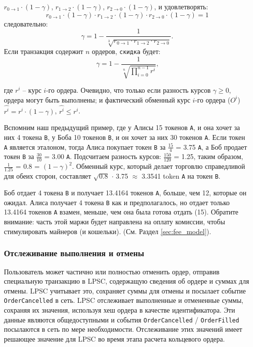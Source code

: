 \documentclass[utf8,nofonts]{article}
\begin{document}
\begin{multicols}{2}
	$r_{0\rightarrow 1} \cdot (1-\gamma)$, $r_{1\rightarrow 2} \cdot (1-\gamma)$, $r_{2 \rightarrow 0} \cdot (1-\gamma)$, и удовлетворять: 
	\begin{equation}
	r_{0\rightarrow 1} \cdot (1-\gamma)\cdot r_{1\rightarrow 2} \cdot (1-\gamma) \cdot r_{2 \rightarrow 0} \cdot (1-\gamma) = 1
	\end{equation}
	следовательно: 
	\begin{equation}
	\gamma = 1- \frac{1}{\sqrt[3]{r_{0\rightarrow 1} \cdot r_{1\rightarrow 2} \cdot r_{2\rightarrow 0}}}\text{.}
	\end{equation}
	Если транзакция содержит $n$ ордеров, \texttt{скидка} будет: 
	\begin{equation}
	\gamma = 1- \frac{1}{\sqrt[n]{\prod_{i=0}^{n-1} r^i}} \text{,}
	\end{equation}
	
	где $r^i$ -- курс $i$-го ордера. Очевидно, что только если разность курсов $ \gamma \ge 0 $, ордера могут быть выполнены; и фактический обменный курс $ i $-го ордера ($ O^i $) $\hat{r^i} = r^i \cdot (1-\gamma)$, $\hat{r^i}\le r^i$.
	
	Вспомним наш предыдущий пример, где у Алисы 15 токенов \verb|A|, и она хочет за них 4 токена \verb|B|, у Боба 10 токенов \verb|B|, и он хочет за них 30 токенов \verb|A|. Если токен \verb|A| является эталоном, тогда Алиса покупает токен \verb|B| за $ \frac{15}{4} $ = 3.75 \verb|A|, а Боб продает токен \verb|B| за $ \frac {30} {10} $ = 3.00 \verb|A|. Подсчитаем разность курсов: $ \frac {150} {120} $ = 1.25, таким образом, $ \frac {1} {1.25} $ = 0.8 = $ (1 - \gamma) ^ 2 $. Обменный курс, который делает торговлю справедливой для обеих сторон, составляет $ \sqrt {0.8} $ $ \cdot $ 3.75 $ \approx $ 3.3541 token \verb|A| на токен \verb|B|.
	
	Боб отдает 4 токена \verb|B| и получает 13.4164 токенов \verb|A|, больше, чем 12, которые он ожидал. Алиса получает 4 токена \verb|B| как и предполагалось, но отдает только 13.4164 токенов \verb|A| взамен, меньше, чем она была готова отдать (15).
	Обратите внимание: часть этой маржи будет направлена на оплату комиссии, чтобы стимулировать майнеров (и кошельки). (См. Раздел \ref{sec:fee_model}).
	
	
	\subsubsection{Отслеживание выполнения и отмены}
	
	Пользователь может частично или полностью отменить ордер, отправив специальную транзакцию в LPSC, содержащую сведения об ордере и суммах для отмены. LPSC учитывает это, сохраняет суммы для отмены и посылает событие \verb|OrderCancelled| в сеть. LPSC отслеживает выполненные и отмененные суммы, сохраняя их значения, используя хеш ордера в качестве идентификатора. Эти данные являются общедоступными и события \verb|OrderCancelled| / \verb|OrderFilled| посылаются в сеть по мере необходимости. Отслеживание этих значений имеет решающее значение для LPSC во время этапа расчета кольцевого ордера.
	

\end{multicols}
\end{document}
